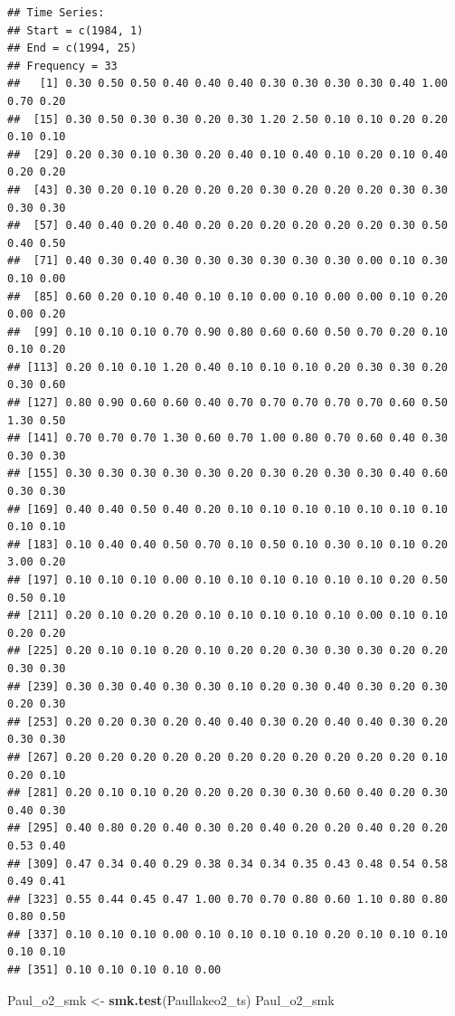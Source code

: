 \documentclass[12pt,]{article}
\newenvironment{Shaded}{\begin{snugshade}}{\end{snugshade}}
\newcommand{\KeywordTok}[1]{\textcolor[rgb]{0.13,0.29,0.53}{\textbf{#1}}}
\newcommand{\StringTok}[1]{\textcolor[rgb]{0.31,0.60,0.02}{#1}}
\newcommand{\NormalTok}[1]{#1}
\begin{document}
\begin{verbatim}
## Time Series:
## Start = c(1984, 1) 
## End = c(1994, 25) 
## Frequency = 33 
##   [1] 0.30 0.50 0.50 0.40 0.40 0.40 0.30 0.30 0.30 0.30 0.40 1.00 0.70 0.20
##  [15] 0.30 0.50 0.30 0.30 0.20 0.30 1.20 2.50 0.10 0.10 0.20 0.20 0.10 0.10
##  [29] 0.20 0.30 0.10 0.30 0.20 0.40 0.10 0.40 0.10 0.20 0.10 0.40 0.20 0.20
##  [43] 0.30 0.20 0.10 0.20 0.20 0.20 0.30 0.20 0.20 0.20 0.30 0.30 0.30 0.30
##  [57] 0.40 0.40 0.20 0.40 0.20 0.20 0.20 0.20 0.20 0.20 0.30 0.50 0.40 0.50
##  [71] 0.40 0.30 0.40 0.30 0.30 0.30 0.30 0.30 0.30 0.00 0.10 0.30 0.10 0.00
##  [85] 0.60 0.20 0.10 0.40 0.10 0.10 0.00 0.10 0.00 0.00 0.10 0.20 0.00 0.20
##  [99] 0.10 0.10 0.10 0.70 0.90 0.80 0.60 0.60 0.50 0.70 0.20 0.10 0.10 0.20
## [113] 0.20 0.10 0.10 1.20 0.40 0.10 0.10 0.10 0.20 0.30 0.30 0.20 0.30 0.60
## [127] 0.80 0.90 0.60 0.60 0.40 0.70 0.70 0.70 0.70 0.70 0.60 0.50 1.30 0.50
## [141] 0.70 0.70 0.70 1.30 0.60 0.70 1.00 0.80 0.70 0.60 0.40 0.30 0.30 0.30
## [155] 0.30 0.30 0.30 0.30 0.30 0.20 0.30 0.20 0.30 0.30 0.40 0.60 0.30 0.30
## [169] 0.40 0.40 0.50 0.40 0.20 0.10 0.10 0.10 0.10 0.10 0.10 0.10 0.10 0.10
## [183] 0.10 0.40 0.40 0.50 0.70 0.10 0.50 0.10 0.30 0.10 0.10 0.20 3.00 0.20
## [197] 0.10 0.10 0.10 0.00 0.10 0.10 0.10 0.10 0.10 0.10 0.20 0.50 0.50 0.10
## [211] 0.20 0.10 0.20 0.20 0.10 0.10 0.10 0.10 0.10 0.00 0.10 0.10 0.20 0.20
## [225] 0.20 0.10 0.10 0.20 0.10 0.20 0.20 0.30 0.30 0.30 0.20 0.20 0.30 0.30
## [239] 0.30 0.30 0.40 0.30 0.30 0.10 0.20 0.30 0.40 0.30 0.20 0.30 0.20 0.30
## [253] 0.20 0.20 0.30 0.20 0.40 0.40 0.30 0.20 0.40 0.40 0.30 0.20 0.30 0.30
## [267] 0.20 0.20 0.20 0.20 0.20 0.20 0.20 0.20 0.20 0.20 0.20 0.10 0.20 0.10
## [281] 0.20 0.10 0.10 0.20 0.20 0.20 0.30 0.30 0.60 0.40 0.20 0.30 0.40 0.30
## [295] 0.40 0.80 0.20 0.40 0.30 0.20 0.40 0.20 0.20 0.40 0.20 0.20 0.53 0.40
## [309] 0.47 0.34 0.40 0.29 0.38 0.34 0.34 0.35 0.43 0.48 0.54 0.58 0.49 0.41
## [323] 0.55 0.44 0.45 0.47 1.00 0.70 0.70 0.80 0.60 1.10 0.80 0.80 0.80 0.50
## [337] 0.10 0.10 0.10 0.00 0.10 0.10 0.10 0.10 0.20 0.10 0.10 0.10 0.10 0.10
## [351] 0.10 0.10 0.10 0.10 0.00
\end{verbatim}

\begin{Shaded}
\begin{Highlighting}[]
\NormalTok{Paul_o2_smk <-}\StringTok{ }\KeywordTok{smk.test}\NormalTok{(Paullakeo2_ts)}
\NormalTok{Paul_o2_smk}
\end{Highlighting}
\end{Shaded}
\end{document}
